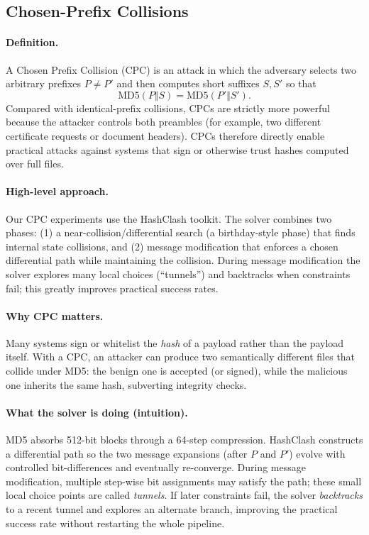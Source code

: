 \documentclass[runningheads]{llncs}
\begin{document}
    \subsection{Chosen-Prefix Collisions}\label{sec:cpc}
    \paragraph{Definition.}
    A Chosen Prefix Collision (CPC) is an attack in which the adversary selects two arbitrary prefixes \(P\neq P'\) and then computes short suffixes \(S,S'\) so that
    \[
        \mathrm{MD5}(P\Vert S)=\mathrm{MD5}(P'\Vert S').
    \]
    Compared with identical-prefix collisions, CPCs are strictly more powerful because the attacker controls both preambles (for example, two different certificate requests or document headers). CPCs therefore directly enable practical attacks against systems that sign or otherwise trust hashes computed over full files.


    \paragraph{High-level approach.}
    Our CPC experiments use the HashClash toolkit. The solver combines two phases: (1) a near-collision/differential search (a birthday-style phase) that finds internal state collisions, and (2) message modification that enforces a chosen differential path while maintaining the collision. During message modification the solver explores many local choices (“tunnels”) and backtracks when constraints fail; this greatly improves practical success rates.

    \paragraph{Why CPC matters.}
    Many systems sign or whitelist the \emph{hash} of a payload rather than the payload itself. With a CPC, an attacker can produce two semantically different files that collide under MD5: the benign one is accepted (or signed), while the malicious one inherits the same hash, subverting integrity checks.

    \paragraph{What the solver is doing (intuition).}
    MD5 absorbs 512-bit blocks through a 64-step compression. HashClash constructs a differential path so the two message expansions (after \(P\) and \(P'\)) evolve with controlled bit-differences and eventually re-converge. During message modification, multiple step-wise bit assignments may satisfy the path; these small local choice points are called \emph{tunnels}. If later constraints fail, the solver \emph{backtracks} to a recent tunnel and explores an alternate branch, improving the practical success rate without restarting the whole pipeline.
\end{document}
